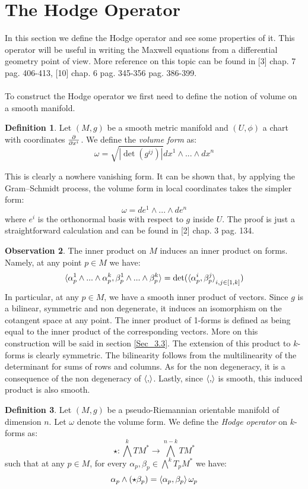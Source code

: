 \documentclass[12pt,a4paper]{report}
\theoremstyle{definition}
\newtheorem{Def}{Definition}[chapter]
\theoremstyle{Theorem}
\theoremstyle{definition}
\theoremstyle{definition}
\newtheorem{Obs}[Def]{Observation}
\begin{document}
	\section{The Hodge Operator}
	In this section we define the Hodge operator and see some properties of it. This operator will be useful in writing the Maxwell equations from a differential geometry point of view. More reference on this topic can be found in [3] chap. 7 pag. 406-413, [10] chap. 6 pag. 345-356 pag. 386-399.\\
	\\
	To construct the Hodge operator we first need to define the notion of volume on a smooth manifold.
	\begin{Def}
		Let $(M,g)$ be a smooth metric manifold and $(U,\phi)$ a chart with coordinates $\partial\over \partial x^i$. We define the \textit{volume form} as:
		$$\omega=\sqrt{|\det(g^{ij})|}dx^1\wedge...\wedge dx^n$$
	\end{Def}
	This is clearly a nowhere vanishing form. It can be shown that, by applying the Gram–Schmidt process, the volume form in local coordinates takes the simpler form:
	$$\omega=de^1\wedge...\wedge de^n$$
	where $e^i$ is the orthonormal basis with respect to $g$ inside $U$. The proof is just a straightforward calculation and can be found in [2] chap. 3 pag. 134.
	\begin{Obs}\label{Obs_1.7.1}
		The inner product on $M$ induces an inner product on forms. Namely, at any point $p\in M$ we have:
		$$\braket{\alpha^1_p\wedge...\wedge \alpha^k_p,\beta^1_p\wedge...\wedge\beta^k_p}=\det(\braket{\alpha^i_p,\beta^j_p}_{i,j\in[1,k]})$$
		In particular, at any $p\in M$, we have a smooth inner product of vectors. Since $g$ is a bilinear, symmetric and non degenerate, it induces an isomorphism on the cotangent space at any point. The inner product of 1-forms is defined as being equal to the inner product of the corresponding vectors. More on this construction will be said in section \ref{Sec_3.3}.
		The extension of this product to $k$-forms is clearly symmetric. The bilinearity follows from the multilinearity of the determinant for sums of rows and columns. As for the non degeneracy, it is a consequence of the non degeneracy of $\braket{,}$. Lastly, since $\braket{,}$ is smooth, this induced product is also smooth.
	\end{Obs}
	\begin{Def}
		Let $(M,g)$ be a pseudo-Riemannian orientable manifold of dimension $n$. Let $\omega$ denote the volume form. We define the \textit{Hodge operator} on $k$-forms as:
		$$\star:\bigwedge^kTM^*\rightarrow \bigwedge^{n-k}TM^*$$
		such that at any $p\in M$, for every $\alpha_p,\beta_p\in\bigwedge^kT_pM^*$ we have:
		$$\alpha_p\wedge(\star\beta_p)=\braket{\alpha_p,\beta_p}\omega_p$$
	\end{Def}
\end{document}
